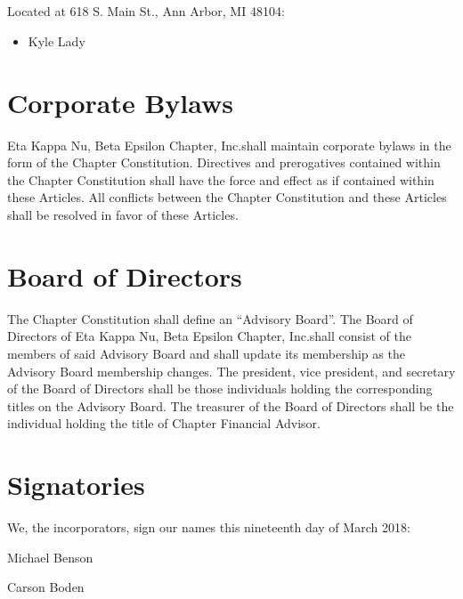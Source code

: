\documentclass[incorporation,proposal,withoutpreface,withoutoptional,11pt,final]{bylaws}
\begin{document}
\section{} Located at 618 S. Main St., Ann Arbor, MI 48104:
\begin{itemize}
	\item Kyle Lady
\end{itemize}

\chapter{Corporate Bylaws}
Eta Kappa Nu, Beta Epsilon Chapter, Inc.\@ shall maintain corporate bylaws in the form of the Chapter Constitution. 
Directives and prerogatives contained within the Chapter Constitution shall have the force and effect as if contained within these Articles.
All conflicts between the Chapter Constitution and these Articles shall be resolved in favor of these Articles.

\chapter{Board of Directors}
The Chapter Constitution shall define an ``Advisory Board''. 
The Board of Directors of Eta Kappa Nu, Beta Epsilon Chapter, Inc.\@ shall consist of the members of said Advisory Board and shall update its membership as the Advisory Board membership changes.
The president, vice president, and secretary of the Board of Directors shall be those individuals holding the corresponding titles on the Advisory Board.
The treasurer of the Board of Directors shall be the individual holding the title of Chapter Financial Advisor.                                                                                                                                                                                                                  

\chapter*{Signatories} 

We, the incorporators, sign our names this nineteenth day of March 2018:
\vspace{0.5in}

\vspace{0.5in}
\noindent Michael Benson

\vspace{0.5in}
\noindent Carson Boden
\end{document}
